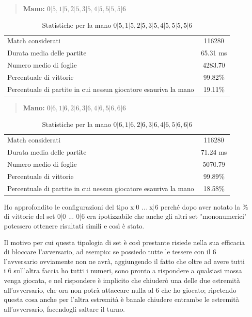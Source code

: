 \documentclass[a4paper,12pt]{report} %
\begin{document}
\begin{quote}
    \textbf{Mano:} \(0|5, 1|5, 2|5, 3|5, 4|5, 5|5, 5|6\)
\end{quote}

\begin{table}[h!]
    \centering
    \begin{tabular}{|l|c|}
        \hline
        Match considerati & 116280 \\
        Durata media delle partite &  65.31 ms \\
        Numero medio di foglie &   4283.70 \\
        Percentuale di vittorie & 99.82\% \\
        Percentuale di partite in cui nessun giocatore esauriva la mano &  19.11\% \\
        \hline
    \end{tabular}
    \caption{Statistiche per la mano \(0|5, 1|5, 2|5, 3|5, 4|5, 5|5, 5|6\)}
    \label{tab:stats_tutti_5}
\end{table}


\begin{quote}
    \textbf{Mano:} \(0|6, 1|6, 2|6, 3|6, 4|6, 5|6, 6|6\)
\end{quote}

\begin{table}[h!]
    \centering
    \begin{tabular}{|l|c|}
        \hline
        Match considerati & 116280 \\
        Durata media delle partite &  71.24 ms \\
        Numero medio di foglie &  5070.79 \\
        Percentuale di vittorie & 99.89\% \\
        Percentuale di partite in cui nessun giocatore esauriva la mano &  18.58\% \\
        \hline
    \end{tabular}
    \caption{Statistiche per la mano \(0|6, 1|6, 2|6, 3|6, 4|6, 5|6, 6|6\)}
    \label{tab:stats_tutti_6}
\end{table}

Ho approfondito le configurazioni del tipo x|0 ... x|6 perché dopo aver notato la \% di vittorie del set 0|0 ... 0|6 era ipotizzabile che anche gli altri set "mononumerici" potessero ottenere risultati simili e così è stato.

Il motivo per cui questa tipologia di set è così prestante risiede nella sua efficacia di bloccare l'avversario, ad esempio: se possiedo tutte le tessere con il 6 l'avversario ovviamente non ne avrà, aggiungendo il fatto che oltre ad avere tutti i 6 sull'altra faccia ho tutti i numeri, sono pronto a rispondere a qualsiasi mossa venga giocata, e nel rispondere è implicito che chiuderò una delle due estremità all'avversario, che ora non potrà attaccare nulla al 6 che ho giocato; ripetendo questa cosa anche per l'altra estremità è banale chiudere entrambe le estremità all'avversario, facendogli saltare il turno.
\end{document}
